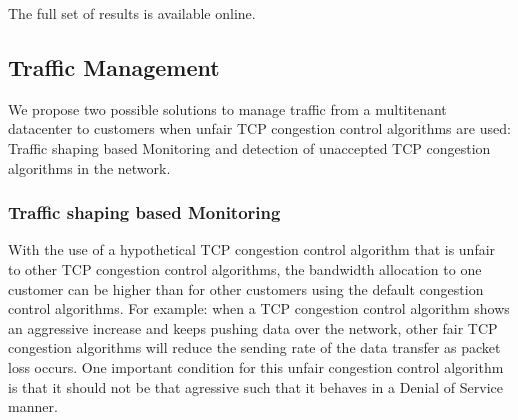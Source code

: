 \documentclass{article}
\begin{document}
The full set of results is available online\cite{git-lsproj}.


\subsection{Traffic Management}
We propose two possible solutions to manage traffic from a multitenant datacenter to customers when unfair TCP congestion control algorithms are used: Traffic shaping based Monitoring and detection of unaccepted TCP congestion algorithms in the network. 

\subsubsection{Traffic shaping based Monitoring}
With the use of a hypothetical TCP congestion control algorithm that is unfair to other TCP congestion control algorithms, the bandwidth allocation to one customer can be higher than for other customers using the default congestion control algorithms. For example: when a TCP congestion control algorithm shows an aggressive increase and keeps pushing data over the network, other fair TCP congestion algorithms will reduce the sending rate of the data transfer as packet loss occurs. One important condition for this unfair congestion control algorithm is that it should not be that agressive such that it behaves in a Denial of Service manner.
\end{document}
